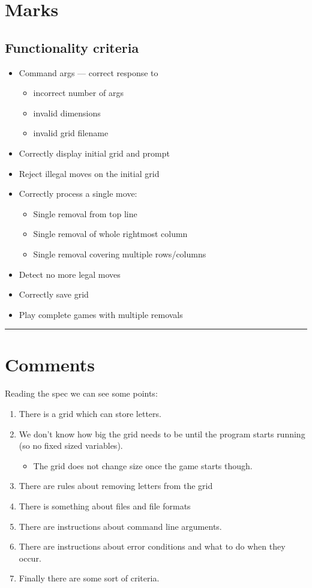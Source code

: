 \section{Marks}

\subsection{Functionality criteria}

\begin{center}
\begin{itemize}
\item Command args --- correct response to
\begin{itemize}
 \item incorrect number of args
 \item invalid dimensions
 \item invalid grid filename
\end{itemize}
\item Correctly display initial grid and prompt
\item Reject illegal moves on the initial grid
\item Correctly process a single move:
\begin{itemize}
 \item Single removal from top line
 \item Single removal of whole rightmost column
 \item Single removal covering multiple rows/columns
\end{itemize}
\item Detect no more legal moves
\item Correctly save grid
\item Play complete games with multiple removals
\end{itemize}
\end{center}

\hrule
\section{Comments}\label{sec:breakdown}

Reading the spec we can see some points:
\begin{enumerate}
 \item There is a grid which can store letters.
 \item We don't know how big the grid needs to be until the program starts running (so no fixed sized variables).
 \begin{itemize}
  \item The grid does not change size once the game starts though.
 \end{itemize}
 \item There are rules about removing letters from the grid
 \item There is something about files and file formats
\item There are instructions about command line arguments.
 \item There are instructions about error conditions and what to do when they occur.
 \item Finally there are some sort of criteria.
\end{enumerate}

